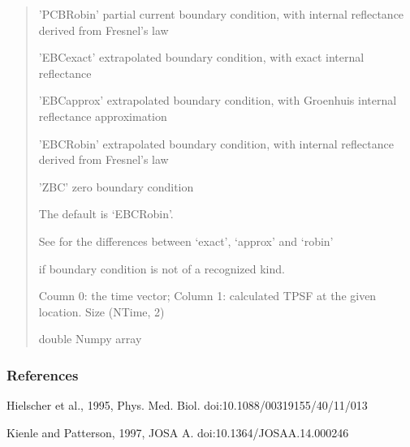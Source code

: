 \documentclass[letterpaper,10pt,english]{sphinxmanual}
\begin{document}
\begin{fulllineitems}
\begin{quote}
\begin{description}
\begin{itemize}
\sphinxAtStartPar
’PCB\sphinxhyphen{}Robin’ \sphinxhyphen{} partial current boundary condition, with internal reflectance derived from Fresnel’s law

\sphinxAtStartPar
’EBC\sphinxhyphen{}exact’ \sphinxhyphen{} extrapolated boundary condition, with exact internal reflectance

\sphinxAtStartPar
’EBC\sphinxhyphen{}approx’ \sphinxhyphen{} extrapolated boundary condition, with Groenhuis internal reflectance approximation

\sphinxAtStartPar
’EBC\sphinxhyphen{}Robin’ \sphinxhyphen{} extrapolated boundary condition, with internal reflectance derived from Fresnel’s law

\sphinxAtStartPar
’ZBC’ \sphinxhyphen{} zero boundary condition

\sphinxAtStartPar
The default is ‘EBC\sphinxhyphen{}Robin’.

\sphinxAtStartPar
See {\hyperref[\detokenize{_autosummary/nirfasterff.utils.boundary_attenuation:nirfasterff.utils.boundary_attenuation}]{}} for the differences between ‘exact’, ‘approx’ and ‘robin’


\end{itemize}

\sphinxAtStartPar
{} \textendash{} if boundary condition is not of a recognized kind.

\sphinxAtStartPar
{} \textendash{} Coumn 0: the time vector; Column 1: calculated TPSF at the given location. Size (NTime, 2)

\sphinxAtStartPar
double Numpy array

\end{description}\end{quote}
\subsubsection*{References}

\sphinxAtStartPar
Hielscher et al., 1995, Phys. Med. Biol. doi:10.1088/0031\sphinxhyphen{}9155/40/11/013

\sphinxAtStartPar
Kienle and Patterson, 1997, JOSA A. doi:10.1364/JOSAA.14.000246

\end{fulllineitems}


\sphinxstepscope
\end{document}
